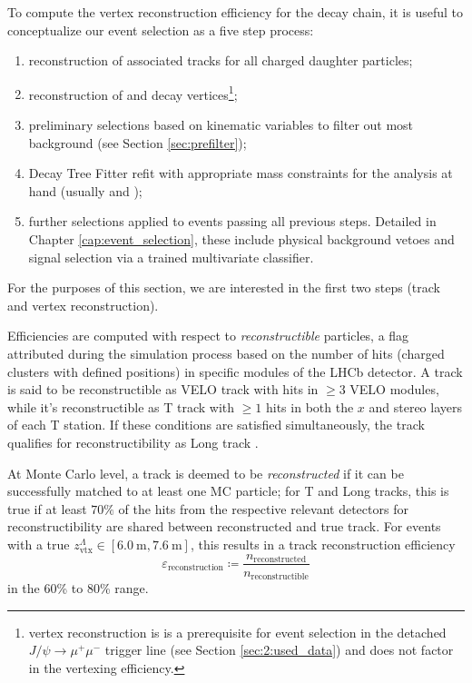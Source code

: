 To compute the vertex reconstruction efficiency for the \lbz decay chain, it is useful to conceptualize our event selection as a five step process:
\begin{enumerate}
	\item reconstruction of associated tracks for all charged daughter particles;
	\item reconstruction of \lz and \lbz decay vertices\footnote{\jpsi vertex reconstruction is is a prerequisite for event selection in the detached $J/\psi\rightarrow \mu^+ \mu^-$ trigger line (see Section \ref{sec:2:used_data}) and does not factor in the vertexing efficiency.};
	\item preliminary selections based on kinematic variables to filter out most background (see Section \ref{sec:prefilter});
	\item Decay Tree Fitter refit with appropriate mass constraints for the analysis at hand (usually \jpsi and \lz);
	\item further selections applied to events passing all previous steps. Detailed in Chapter \ref{cap:event_selection}, these include physical background vetoes and signal selection via a trained multivariate classifier.
\end{enumerate}

For the purposes of this section, we are interested in the first two steps (track and vertex reconstruction).

Efficiencies are computed with respect to \textit{reconstructible} particles, a flag attributed during the simulation process based on the number of hits (charged clusters with defined positions) in specific modules of the LHCb detector.
A track is said to be reconstructible as VELO track with hits in $\geq 3$ VELO modules, while it's reconstructible as T track with $\geq 1$ hits in both the $x$ and stereo layers of each T station.
If these conditions are satisfied simultaneously, the track qualifies for reconstructibility as Long track \cite{Li:2752971}.

At Monte Carlo level, a track is deemed to be \textit{reconstructed} if it can be successfully matched to at least one MC particle;
for T and Long tracks, this is true if at least $70\%$ of the hits from the respective relevant detectors for reconstructibility are shared between reconstructed and true track. For \demonstratorshort events with a true $z_\text{vtx}^\Lambda \in [\SI{6.0}{\meter}, \SI{7.6}{\meter}]$, this results in a track reconstruction efficiency
\begin{equation}
	\varepsilon_\text{reconstruction} \coloneqq \frac{n_\text{reconstructed}}{n_\text{reconstructible}}
\end{equation}
in the 60\% to 80\% range.

